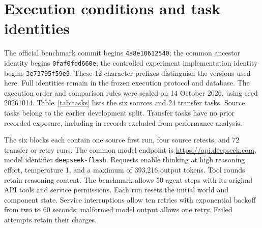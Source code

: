\setcounter{table}{0}
\renewcommand{\thetable}{S\arabic{table}}
\renewcommand{\theHtable}{S\arabic{table}}

\section{Execution conditions and task identities}

The official benchmark commit begins \texttt{4a8e10612540};
the common ancestor identity begins \texttt{0faf0fdd660e};
the controlled experiment implementation identity begins \texttt{3e73795f59e9}.
These 12 character prefixes distinguish the versions used here. Full identities remain in the frozen execution protocol and database.
The execution order and comparison rules were sealed on 14 October 2026, using seed 20261014. Table~\ref{tab:tasks} lists the six sources and 24 transfer tasks. Source tasks belong to the earlier development split. Transfer tasks have no prior recorded exposure, including in records excluded from performance analysis.

The six blocks each contain one source first run, four source retests, and 72 transfer or retry runs. The common model endpoint is \url{https://api.deepseek.com}, model identifier \texttt{deepseek-flash}. Requests enable thinking at high reasoning effort, temperature 1, and a maximum of 393,216 output tokens. Tool rounds retain reasoning content. The benchmark allows 50 agent steps with its original API tools and service permissions. Each run resets the initial world and component state. Service interruptions allow ten retries with exponential backoff from two to 60 seconds; malformed model output allows one retry. Failed attempts retain their charges.

